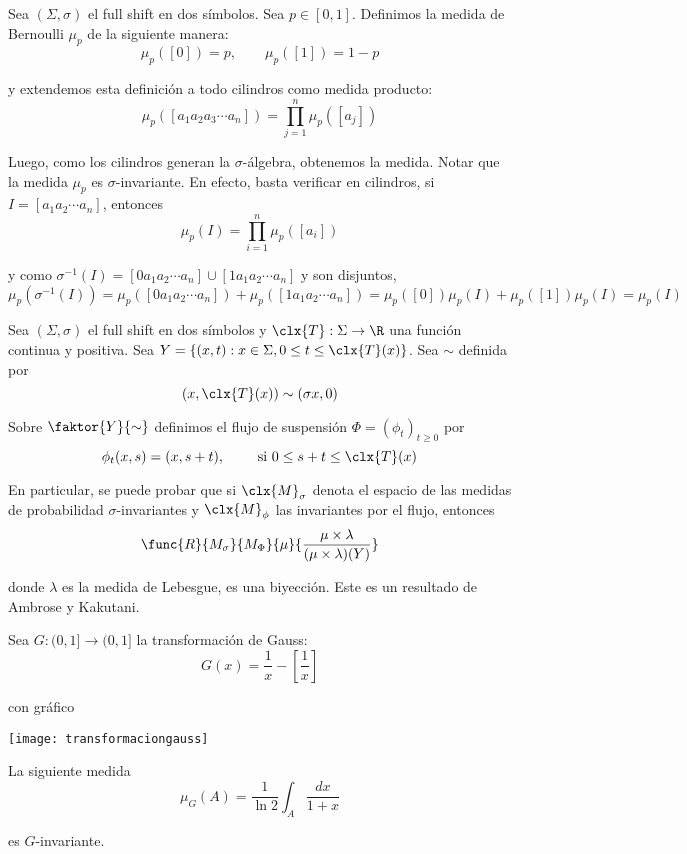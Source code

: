 \documentclass[	docname= Sistemas\ Din\'amicos,
				finished=1,
				semester=1,
				year=2017,
				professor=Godofredo\ Iommi,
				sigla=MAT2565]{apunte}
\begin{document}
\begin{ex} Sea $(\Sigma, \sigma)$ el full shift en dos símbolos. Sea $p \in [0,1]$. Definimos la medida de Bernoulli $\mu_{p}$ de la siguiente manera:
	$$\mu_{p}([0]) = p, \qquad \mu_{p}([1]) = 1-p$$

y extendemos esta definición a todo cilindros como medida producto:
	$$\mu_{p}([a_{1} a_{2} a_{3} \cdots a_{n}]) = \prod_{j=1}^{n} \mu_{p}([a_{j}])$$

Luego, como los cilindros generan la $\sigma$-álgebra, obtenemos la medida. Notar que la medida $\mu_{p}$ es $\sigma$-invariante. En efecto, basta verificar en cilindros, si $I = [a_{1}a_{2} \cdots a_{n}]$, entonces
	$$\mu_{p}(I) = \prod_{i=1}^{n} \mu_{p}([a_{i}])$$

y como $\sigma^{-1}(I) = [0a_{1}a_{2}\cdots a_{n}] \cup [1a_{1}a_{2} \cdots a_{n}]$ y son disjuntos,
	$$\mu_{p}(\sigma^{-1}(I))
		=	\mu_{p}([0a_{1}a_{2} \cdots a_{n}]) + \mu_{p}([1 a_{1} a_{2} \cdots a_{n}])
		=	\mu_{p}([0])\mu_{p}(I) + \mu_{p}([1])\mu_{p}(I)
		=	\mu_{p}(I)$$
\end{ex}

\begin{ex} Sea $(\Sigma, \sigma)$ el full shift en dos símbolos y $\clx{T}: \Sigma \to \R$ una función continua y positiva. Sea $Y = \{(x,t) : x \in \Sigma, 0 \leq t \leq \clx{T}(x)\}$. Sea $\sim$ definida por
	$$(x, \clx{T}(x)) \sim (\sigma x, 0)$$

Sobre $\faktor{Y}{\sim}$ definimos el flujo de suspensión $\Phi = (\phi_{t})_{t \geq 0}$ por
	$$\phi_{t}(x,s)  = (x, s+t), \qquad \text{ si } 0 \leq s + t \leq \clx{T}(x)$$

En particular, se puede probar que si $\clx{M}_{\sigma}$ denota el espacio de las medidas de probabilidad $\sigma$-invariantes y $\clx{M}_{\phi}$ las invariantes por el flujo, entonces
	$$\func{R}{M_{\sigma}}{M_{\Phi}}
			{\mu}{\frac{\mu \times \lambda}{(\mu \times \lambda)(Y)}}$$
		
donde $\lambda$ es la medida de Lebesgue, es una biyección. Este es un resultado de Ambrose y Kakutani.
\end{ex}

\begin{ex} Sea $G: (0,1] \to (0,1]$ la transformación de Gauss:
	$$G(x) = \frac{1}{x} - \left[\frac{1}{x}\right]$$

con gráfico
	\begin{center}
		\texttt{[image: transformaciongauss]}
	\end{center}

La siguiente medida
	$$\mu_{G}(A) = \frac{1}{\ln 2} \int_{A} \frac{dx}{1+x}$$
	
es $G$-invariante.
\end{ex}
\end{document}
